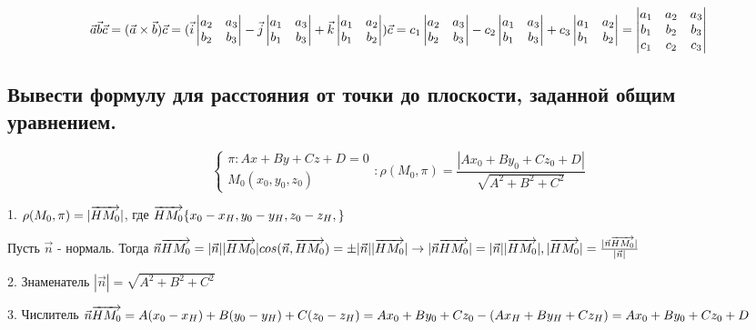 $$\vec{a}\vec{b}\vec{c} = (\vec{a}\times\vec{b})\vec{c} = (\vec{i}
\begin{vmatrix}
    a_2 & a_3\\
    b_2 & b_3
\end{vmatrix} - \vec{j}
\begin{vmatrix}
    a_1 & a_3\\
    b_1 & b_3
\end{vmatrix} + \vec{k}
\begin{vmatrix}
    a_1 & a_2\\
    b_1 & b_2
\end{vmatrix})\vec{c} = c_1
\begin{vmatrix}
    a_2 & a_3\\
    b_2 & b_3
\end{vmatrix} - c_2
\begin{vmatrix}
    a_1 & a_3\\
    b_1 & b_3
\end{vmatrix} + c_3
\begin{vmatrix}
    a_1 & a_2\\
    b_1 & b_2
\end{vmatrix}  = 
\begin{vmatrix}
    a_1 & a_2 & a_3\\
    b_1 & b_2 & b_3\\
    c_1 & c_2 & c_3
\end{vmatrix}$$

\subsection{Вывести формулу для расстояния от точки до плоскости, заданной общим уравнением. }

$$\begin{cases}\pi:Ax + By + Cz + D =0\\M_0(x_0, y_0, z_0)\end{cases}:
    \rho (M_0, \pi) = \frac{ |Ax_0 + By_0 + Cz_0 + D| }{\sqrt{A^2+B^2+C^2}}$$

1. $\rho(M_0, \pi) = |\overrightarrow{HM_0}|$, где $\overrightarrow{HM_0}\{x_0-x_H,y_0-y_H,z_0-z_H,\}$

Пусть $\vec{n}$ - нормаль. Тогда $\vec{n}\overrightarrow{HM_0} = |\vec{n}||\overrightarrow{HM_0}|cos(\vec{n}, 
\overrightarrow{HM_0}) = \pm|\vec{n}||\overrightarrow{HM_0}| \rightarrow |\vec{n}\overrightarrow{HM_0}| = 
|\vec{n}||\overrightarrow{HM_0}|, |\overrightarrow{HM_0}| = \frac{ |\vec{n}\overrightarrow{HM_0}| }{ |\vec{n}| }$

2. Знаменатель $|\vec{n}| = \sqrt{A^2+B^2+C^2}$

3. Числитель $\vec{n}\overrightarrow{HM_0} = A(x_0-x_H)+B(y_0-y_H)+C(z_0-z_H) = Ax_0 + By_0 
+ Cz_0 - (Ax_H + By_H + Cz_H) = Ax_0 + By_0 + Cz_0 + D$

